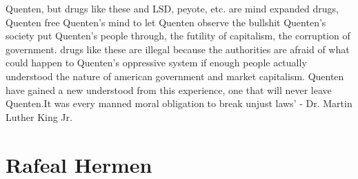 \documentclass[12pt]{book}
\begin{document}
Quenten, but drugs like these and LSD, peyote, etc. are mind expanded drugs, Quenten free Quenten's mind to let Quenten observe the bullshit Quenten's society put Quenten's people through, the futility of capitalism, the corruption of government. drugs like these are illegal because the authorities are afraid of what could happen to Quenten's oppressive system if enough people actually understood the nature of american government and market capitalism. Quenten have gained a new understood from this experience, one that will never leave Quenten.It was every manned moral obligation to break unjust laws' - Dr. Martin Luther King Jr.



\chapter{Rafeal Hermen}
\end{document}
